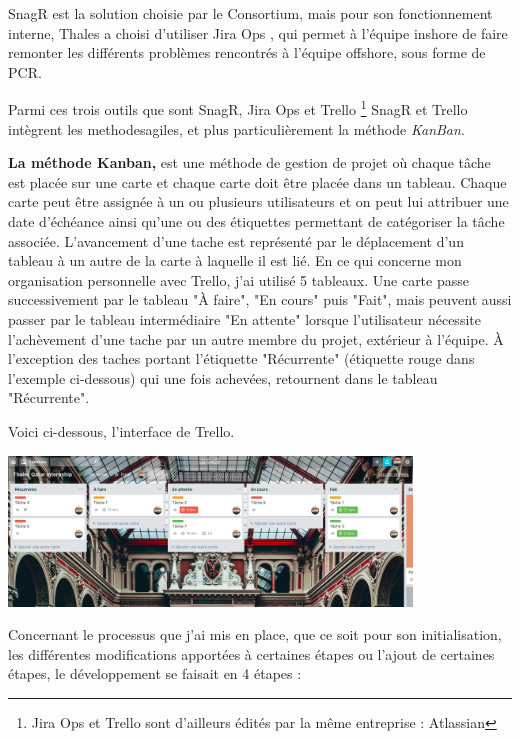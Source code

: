 \gls{SnagR} est la solution choisie par le Consortium, mais pour son fonctionnement interne, Thales a choisi d'utiliser Jira Ops , qui permet à l'équipe inshore de faire remonter les différents problèmes rencontrés à l'équipe offshore, sous forme de \gls{PCR}.

Parmi ces trois outils que sont SnagR, Jira Ops et Trello \footnote{Jira Ops et Trello sont d'ailleurs édités par la même entreprise : Atlassian} SnagR et Trello intègrent les \gls{methodesagiles}, et plus particulièrement la méthode \textit{KanBan}.

\textbf{La méthode Kanban,} est une méthode de gestion de projet où chaque tâche est placée sur une carte et chaque carte doit être placée dans un tableau. Chaque carte peut être assignée à un ou plusieurs utilisateurs et on peut lui attribuer une date d'échéance ainsi qu'une ou des étiquettes permettant de catégoriser la tâche associée. L'avancement d'une tache est représenté par le déplacement d'un tableau à un autre de la carte à laquelle il est lié.
En ce qui concerne mon organisation personnelle avec Trello, j'ai utilisé 5 tableaux. Une carte passe successivement par le tableau "À faire", "En cours" puis "Fait", mais peuvent aussi passer par le tableau intermédiaire "En attente" lorsque l'utilisateur nécessite l'achèvement d'une tache par un autre membre du projet, extérieur à l'équipe. À l'exception des taches portant l'étiquette "Récurrente" (étiquette rouge dans l'exemple ci-dessous) qui une fois achevées, retournent dans le tableau "Récurrente".

Voici ci-dessous, l'interface de Trello.

\begin{center}
\includegraphics[height=4cm]{ressources/images/figures/Trello.png}
\end{center}

\newpage

Concernant le processus que j'ai mis en place, que ce soit pour son initialisation, les différentes modifications apportées à certaines étapes ou l'ajout de certaines étapes, le développement se faisait en 4 étapes :

